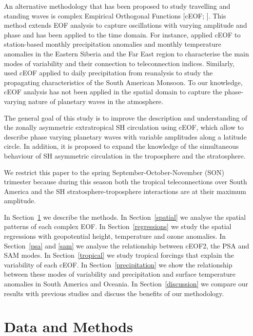 \documentclass[pdflatex,sn-basic]{sn-jnl}
\theoremstyle{thmstyleone}%
\theoremstyle{thmstyletwo}%
\theoremstyle{thmstylethree}%
\begin{document}
An alternative methodology that has been proposed to study travelling and standing waves is complex Empirical Orthogonal Functions {[}cEOF; \citet{horel1984}{]}.
This method extends EOF analysis to capture oscillations with varying amplitude and phase and has been applied to the time domain.
For instance, \citet{krokhin2007} applied cEOF to station-based monthly precipitation anomalies and monthly temperature anomalies in the Eastern Siberia and the Far East region to characterise the main modes of variability and their connection to teleconnection indices.
Similarly, \citet{gelbrecht2018} used cEOF applied to daily precipitation from reanalysis to study the propagating characteristics of the South American Monsoon.
To our knowledge, cEOF analysis has not been applied in the spatial domain to capture the phase-varying nature of planetary waves in the atmosphere.

The general goal of this study is to improve the description and understanding of the zonally asymmetric extratropical SH circulation using cEOF, which allow to describe phase varying planetary waves with variable amplitudes along a latitude circle.
In addition, it is proposed to expand the knowledge of the simultaneous behaviour of SH asymmetric circulation in the troposphere and the stratosphere.

We restrict this paper to the spring September-October-November (SON) trimester because during this season both the tropical teleconnections over South America \citep{cazes-boezio2003} and the SH stratosphere-troposphere interactions \citep{lim2018} are at their maximum amplitude.

In Section~\ref{methods} we describe the methods.
In Section~\ref{spatial} we analyse the spatial patterns of each complex EOF.
In Section~\ref{regressions} we study the spatial regressions with geopotential height, temperature and ozone anomalies.
In Section~\ref{psa} and \ref{sam} we analyse the relationship between cEOF2, the PSA and SAM modes.
In Section~\ref{tropical} we study tropical forcings that explain the variability of each cEOF.
In Section~\ref{precipitation} we show the relationship between these modes of variability and precipitation and surface temperature anomalies in South America and Oceania.
In Section~\ref{discussion} we compare our results with previous studies and discuss the benefits of our methodology.

\hypertarget{methods}{%
\section{Data and Methods}\label{methods}}
\end{document}
